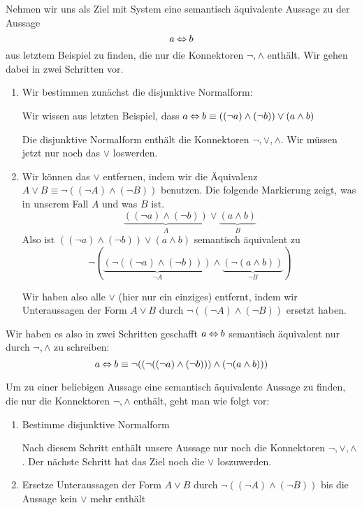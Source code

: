 \documentclass[../../main.tex]{subfiles}
\begin{document}
    \begin{example}{}
        Nehmen wir uns als Ziel mit System eine semantisch 
        äquivalente Aussage zu der Aussage
        \[a \mathbin{\Leftrightarrow} b\]
        aus letztem Beispiel zu finden, die nur die Konnektoren $\lnot,\land$
        enthält.
        Wir gehen dabei in zwei Schritten vor.
        \begin{enumerate}
            \item Wir bestimmen zunächst die disjunktive Normalform:
            
                Wir wissen aus letzten Beispiel, dass $a \mathbin{\Leftrightarrow} b \equiv ( (\lnot a) \land (\lnot b)) \lor (a \land b)$

                Die disjunktive Normalform enthält die Konnektoren $\lnot,\lor,\land$. Wir 
                müssen jetzt nur noch das $\lor$ loswerden.
            
            \item Wir können das $\lor$ entfernen, indem wir die Äquivalenz 
            $A \lor B \equiv \lnot ((\lnot A) \land (\lnot B))$ benutzen.
            Die folgende Markierung zeigt, was in unserem Fall 
            $A$ und was $B$ ist.
            \[\underbrace{((\lnot a) \land (\lnot b))}_{A} 
            \lor \underbrace{(a \land b)}_{B} \]
            Also ist $( (\lnot a) \land (\lnot b)) \lor (a \land b)$ semantisch 
            äquivalent zu 
            \[\lnot (   \underbrace{(\lnot ( (\lnot a) \land (\lnot b)))}_{\lnot A} 
                \land \underbrace{(\lnot (a \land b))}_{\lnot B}
            )\] 
            
            Wir haben also alle $\lor$ (hier nur ein einziges) entfernt, indem wir 
            Unteraussagen der Form $A \lor B$ durch $\lnot((\lnot A) \land (\lnot B))$
            ersetzt haben.

        \end{enumerate}

    Wir haben es also in zwei Schritten geschafft $a \mathbin{\Leftrightarrow} b$ semantisch äquivalent 
    nur durch $\lnot,\land$ zu schreiben:
    \[ a \mathbin{\Leftrightarrow} b \equiv \lnot ((\lnot ( (\lnot a) \land (\lnot b))) \land (\lnot (a \land b)))\]
    \end{example}

    Um zu einer beliebigen Aussage eine semantisch äquivalente Aussage 
    zu finden, die nur die Konnektoren $\lnot,\land$ enthält, geht man wie 
    folgt vor:

    \begin{enumerate}
        \item Bestimme disjunktive Normalform
        
            Nach diesem Schritt enthält unsere Aussage nur noch die Konnektoren 
            $\lnot,\lor,\land$. Der nächste Schritt hat das Ziel noch die $\lor$ loszuwerden.
        \item Ersetze Unteraussagen der Form $A \lor B$ durch 
                $\lnot ((\lnot A) \land (\lnot B))$ bis die Aussage kein $\lor$ mehr enthält
    \end{enumerate}
\end{document}
